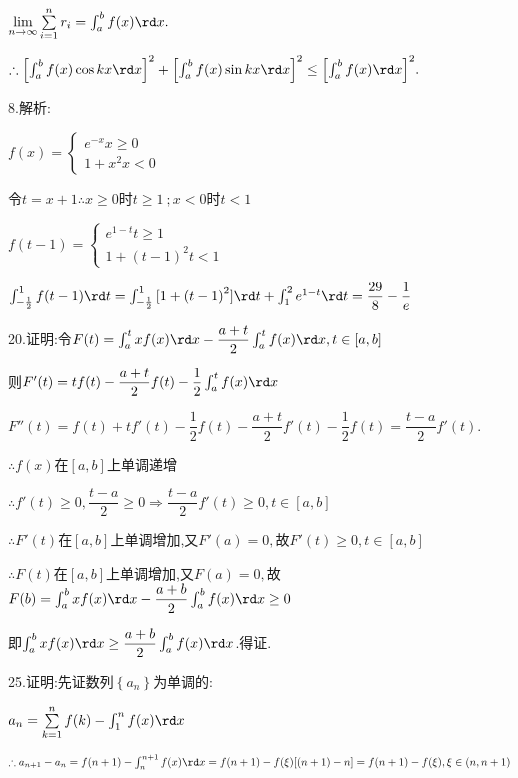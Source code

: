 $\mathop {\lim }\limits_{n \to \infty } \sum\limits_{i = 1}^n {{r_i}}  = \int_a^b {f(x)\rd x} .$

$\therefore {\left[ {\int_a^b {f(x)\cos kx\rd x} } \right]^2} + {\left[ {\int_a^b {f(x)\sin kx\rd x} } \right]^2} \le {\left[ {\int_a^b {f(x)\rd x} } \right]^2}.$

8.解析:

$f(x) = \left\{ \begin{array}{l}
{e^{ - x}} x \ge 0\\
1 + {x^2} x < 0
\end{array} \right.$

令$t = x + 1$$\therefore x \ge 0$时$t \ge 1\ ;$$x < 0 $时$t < 1$

$f(t - 1) = \left\{ \begin{array}{l}
{e^{1 - t}} t \ge 1\\
1 + {(t - 1)^2} t < 1
\end{array} \right.$

$\int_{ - \frac{1}{2}}^1 {f(t - 1)\rd t}  = \int_{ - \frac{1}{2}}^1 {[1 + {{(t - 1)}^2}]\rd t}  + \int_1^2 {{e^{1 - t}}} \rd t = \dfrac{{29}}{8} - \dfrac{1}{e}$

20.证明:令$F(t) = \int_a^t {xf(x)\rd x}  - \dfrac{{a + t}}{2}\int_a^t {f(x)\rd x} ,t \in [a,b]$

则$F'(t) = tf(t) - \dfrac{{a + t}}{2}f(t) - \dfrac{1}{2}\int_a^t {f(x)\rd x} $

$F''(t) = f(t) + tf'(t) - \dfrac{1}{2}f(t) - \dfrac{{a + t}}{2}f'(t) - \dfrac{1}{2}f(t) = \dfrac{{t - a}}{2}f'(t).$

$\therefore f(x)$在$[a,b]$上单调递增

$\therefore f'(t) \ge 0,\dfrac{{t - a}}{2} \ge 0 \Rightarrow \dfrac{{t - a}}{2}f'(t) \ge 0,t \in [a,b]$

$\therefore F'(t)$在$[a,b]$上单调增加,又$F'(a) = 0,$故$F'(t) \ge 0,t \in [a,b]$

$\therefore F(t)$在$[a,b]$上单调增加,又$F(a) = 0,$故$F(b) = \int_a^b {xf(x)\rd x}  - \dfrac{{a + b}}{2}\int_a^b {f(x)\rd x}  \ge 0$

即$\int_a^b {xf(x)\rd x}  \ge \dfrac{{a + b}}{2}\int_a^b {f(x)\rd x} $.得证.

25.证明:先证数列$\left\{ {{a_n}} \right\}$为单调的:

${a_n} = \sum\limits_{k = 1}^n {f(k)}  - \int_1^n {f(x)\rd x} $

$\therefore {a_{n + 1}} - {a_n} = f(n + 1) - \int_n^{n + 1} {f(x)\rd x}  = f(n + 1) - f(\xi )[(n + 1) - n] = f(n + 1) - f(\xi ),\xi  \in (n,n + 1)$

